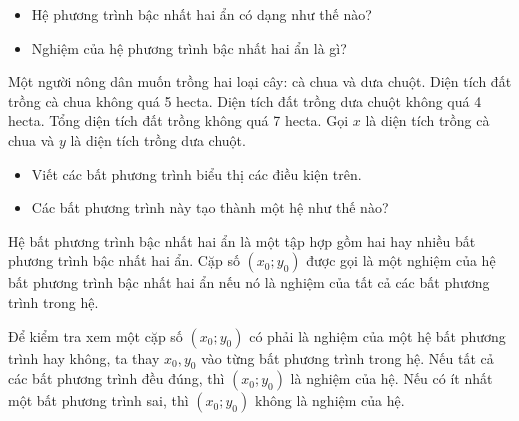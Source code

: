 \begin{hoatdong}
\begin{itemize}
    \item Hệ phương trình bậc nhất hai ẩn có dạng như thế nào?
    \item Nghiệm của hệ phương trình bậc nhất hai ẩn là gì?
\end{itemize}
Một người nông dân muốn trồng hai loại cây: cà chua và dưa chuột. Diện tích đất trồng cà chua không quá 5 hecta. Diện tích đất trồng dưa chuột không quá 4 hecta. Tổng diện tích đất trồng không quá 7 hecta. Gọi $x$ là diện tích trồng cà chua và $y$ là diện tích trồng dưa chuột.
\begin{itemize}
    \item Viết các bất phương trình biểu thị các điều kiện trên.
    \item Các bất phương trình này tạo thành một hệ như thế nào?
\end{itemize}
\end{hoatdong}

\begin{kienthuc}
Hệ bất phương trình bậc nhất hai ẩn là một tập hợp gồm hai hay nhiều bất phương trình bậc nhất hai ẩn.
Cặp số $(x_0; y_0)$ được gọi là một nghiệm của hệ bất phương trình bậc nhất hai ẩn nếu nó là nghiệm của tất cả các bất phương trình trong hệ.
\end{kienthuc}

\begin{emdahoc}
Để kiểm tra xem một cặp số $(x_0; y_0)$ có phải là nghiệm của một hệ bất phương trình hay không, ta thay $x_0, y_0$ vào từng bất phương trình trong hệ. Nếu tất cả các bất phương trình đều đúng, thì $(x_0; y_0)$ là nghiệm của hệ. Nếu có ít nhất một bất phương trình sai, thì $(x_0; y_0)$ không là nghiệm của hệ.
\end{emdahoc}

